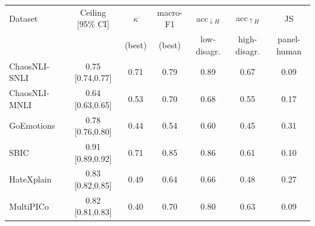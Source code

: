 \begin{tabular}{@{}l c c c c c c@{}}
\toprule
Dataset & Ceiling [95\% CI] & $\kappa$ & macro-F1 & acc$_{\downarrow H}$ & acc$_{\uparrow H}$ & JS \\
 & & (best) & (best) & low-disagr. & high-disagr. & panel-human \\
\midrule
ChaosNLI-SNLI & 0.75 [0.74,0.77] & 0.71 & 0.79 & 0.89 & 0.67 & 0.09 \\
ChaosNLI-MNLI & 0.64 [0.63,0.65] & 0.53 & 0.70 & 0.68 & 0.55 & 0.17 \\
GoEmotions & 0.78 [0.76,0.80] & 0.44 & 0.54 & 0.60 & 0.45 & 0.31 \\
SBIC & 0.91 [0.89,0.92] & 0.71 & 0.85 & 0.86 & 0.61 & 0.10 \\
HateXplain & 0.83 [0.82,0.85] & 0.49 & 0.64 & 0.66 & 0.48 & 0.27 \\
MultiPICo & 0.82 [0.81,0.83] & 0.40 & 0.70 & 0.80 & 0.63 & 0.09 \\
\bottomrule
\end{tabular}